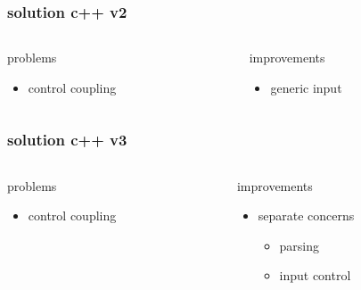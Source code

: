 \begin{frame}
    \frametitle{solution c++ v2}
    \begin{columns}
        \begin{column}{.48\textwidth}
            problems
            \begin{itemize}
                \item control coupling
            \end{itemize}
        \end{column}
        \begin{column}{.48\textwidth}
            improvements
            \begin{itemize}
                \item generic input
            \end{itemize}
        \end{column}
    \end{columns}
\end{frame}


\begin{frame}
    \frametitle{solution c++ v3}
    \begin{columns}
        \begin{column}{.48\textwidth}
            problems
            \begin{itemize}
                \item control coupling
            \end{itemize}
        \end{column}
        \begin{column}{.48\textwidth}
            improvements
            \begin{itemize}
                \item separate concerns
                \begin{itemize}
                    \item parsing
                    \item input control
                \end{itemize}
            \end{itemize}
        \end{column}
    \end{columns}
\end{frame}

